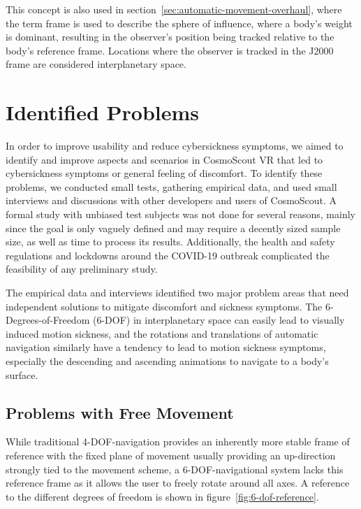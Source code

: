 This concept is also used in section~\ref{sec:automatic-movement-overhaul}, where the term frame is used to describe
the sphere of influence, where a body's weight is dominant, resulting in the observer's position being tracked
relative to the body's reference frame.
Locations where the observer is tracked in the J2000 frame are considered interplanetary space.


\section{Identified Problems}\label{sec:identified-problems}

In order to improve usability and reduce cybersickness symptoms, we aimed to identify and improve aspects and
scenarios in CosmoScout VR that led to cybersickness symptoms or general feeling of discomfort.
To identify these problems, we conducted small tests, gathering empirical data, and used small interviews and
discussions with other developers and users of CosmoScout.
A formal study with unbiased test subjects was not done for several reasons, mainly since the goal is only vaguely
defined and may require a decently sized sample size, as well as time to process its results.
Additionally, the health and safety regulations and lockdowns around the COVID-19 outbreak complicated the feasibility
of any preliminary study.

The empirical data and interviews identified two major problem areas that need independent solutions to mitigate
discomfort and sickness symptoms.
The 6-Degrees-of-Freedom (6-DOF) in interplanetary space can easily lead to visually induced motion sickness, and the
rotations and translations of automatic navigation similarly have a tendency to lead to motion sickness symptoms,
especially the descending and ascending animations to navigate to a body's surface.


\subsection{Problems with Free Movement}\label{subsec:problems-with-free-movement}

While traditional 4-DOF-navigation provides an inherently more stable frame of reference with the fixed plane of
movement usually providing an up-direction strongly tied to the movement scheme, a 6-DOF-navigational system lacks this
reference frame as it allows the user to freely rotate around all axes.
A reference to the different degrees of freedom is shown in figure~\ref{fig:6-dof-reference}.

